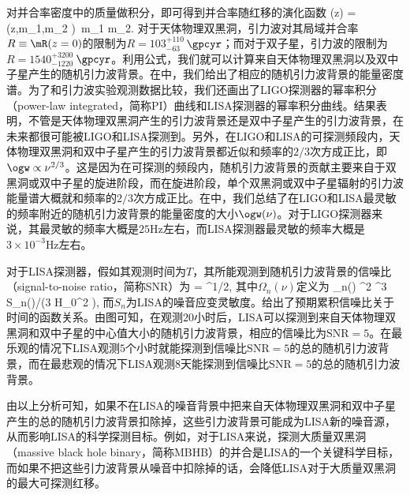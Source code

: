 对并合率密度中的质量做积分，即可得到并合率随红移的演化函数
\e
\mR(z)  =\int \mR(z,m_{1},m_{2} )\, \rmd m_{1} m_{2}.
\q
对于天体物理双黑洞，引力波对其局域并合率$R \equiv \mR(z=0)$的限制为$R = 103_{-63}^{+110}$\,$\gpcyr$\citep{Abbott:2017vtc}；而对于双子星，引力波的限制为$R = 1540_{-1220}^{+3200}$\,$\gpcyr$\citep{TheLIGOScientific:2017qsa}。利用公式，我们就可以计算来自天体物理双黑洞以及双中子星产生的随机引力波背景。在中，我们给出了相应的随机引力波背景的能量密度谱。为了和引力波实验观测数据比较，我们还画出了LIGO探测器\citep{TheLIGOScientific:2017qsa}的幂率积分（power-law integrated，简称PI）曲线和LISA探测器\citep{Cornish:2017vip,Cornish:2018dyw}的幂率积分曲线。结果表明，不管是天体物理双黑洞产生的引力波背景还是双中子星产生的引力波背景，在未来都很可能被LIGO和LISA探测到。另外，在LIGO和LISA的可探测频段内，天体物理双黑洞和双中子星产生的引力波背景都近似和频率的$2/3$次方成正比，即$\ogw \propto \nu^{2/3}$。这是因为在可探测的频段内，随机引力波背景的贡献主要来自于双黑洞或双中子星的旋进阶段，而在旋进阶段，单个双黑洞或双中子星辐射的引力波能量谱大概就和频率的$2/3$次方成正比。在中，我们总结了在LIGO和LISA最灵敏的频率附近的随机引力波背景的能量密度的大小$\ogw (\nu)$。对于LIGO探测器来说，其最灵敏的频率大概是$25$Hz左右，而LISA探测器最灵敏的频率大概是$3\times 10^{-3}$Hz左右。


对于LISA探测器，假如其观测时间为$T$，其所能观测到随机引力波背景的信噪比（signal-to-noise ratio，简称SNR）为\citep{Thrane:2013oya,Caprini:2015zlo}
\e
{}=  ^{1/2},
\q
其中$\Omega_{n}(\nu)$定义为
\e 
\Omega_{n}(\nu) \pi^2 \nu^3 S_{n}(\nu)/\left(3 H_{0}^2 \right),
\q 
而$S_{n}$为LISA的噪音应变灵敏度。给出了预期累积信噪比关于时间的函数关系。由图可知，在观测$20$小时后，LISA可以探测到来自天体物理双黑洞和双中子星的中心值大小的随机引力波背景，相应的信噪比为$\mathrm{SNR} = 5$。在最乐观的情况下LISA观测$5$个小时就能探测到信噪比$\mathrm{SNR} = 5$的总的随机引力波背景，而在最悲观的情况下LISA观测$8$天能探测到信噪比$\mathrm{SNR} = 5$的总的随机引力波背景。

由以上分析可知，如果不在LISA的噪音背景中把来自天体物理双黑洞和双中子星产生的总的随机引力波背景扣除掉，这些引力波背景可能成为LISA新的噪音源，从而影响LISA的科学探测目标。例如，对于LISA来说，探测大质量双黑洞（massive black hole binary，简称MBHB）的并合是LISA的一个关键科学目标\citep{Audley:2017drz}，而如果不把这些引力波背景从噪音中扣除掉的话，会降低LISA对于大质量双黑洞的最大可探测红移。 


